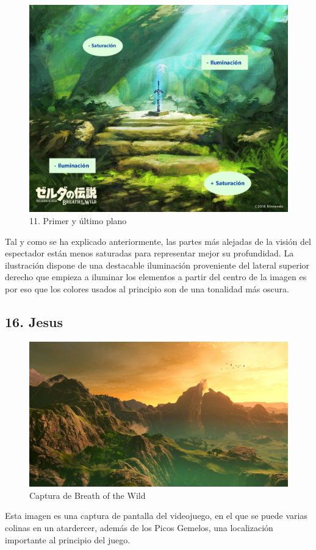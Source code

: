 \documentclass[12pt]{article}
\begin{document}
        \begin{figure}[H]
      \centering
      \includegraphics[width=\textwidth]{images/Carlos/12/Planos.jpg}
      \caption{\small 11. Primer y último plano}
    \end{figure}
    Tal y como se ha explicado anteriormente, las partes más alejadas de la visión del espectador están menos saturadas para representar mejor su profundidad. La ilustración dispone de una destacable iluminación proveniente del lateral superior derecho que empieza a iluminar los elementos a partir del centro de la imagen es por eso que los colores usados al principio son de una tonalidad más oscura.
        \newpage


    \subsection{16. Jesus}
        \begin{figure}[H]
          \centering
          \includegraphics[width=\textwidth]{Jesus/Seccion16/16_concept_art (2).jpg}
          \caption{Captura de Breath of the Wild}
        \end{figure}
        Esta imagen es una captura de pantalla del videojuego, en el que se puede varias colinas en un atardercer, además de los Picos Gemelos, una localización importante al principio del juego.
\end{document}
